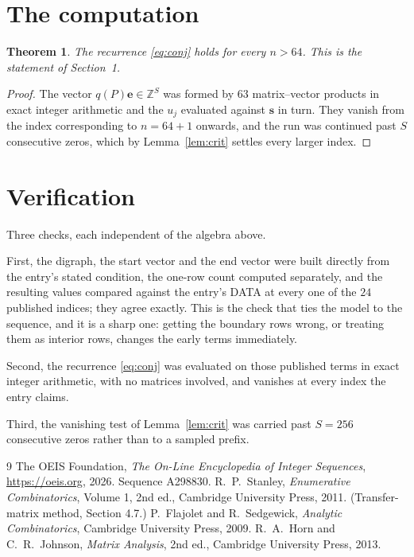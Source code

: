 \documentclass[11pt,a4paper]{article}
\theoremstyle{plain}
\newtheorem{theorem}{Theorem}
\theoremstyle{definition}
\begin{document}
\section{The computation}

\begin{theorem}
The recurrence \eqref{eq:conj} holds for every $n>64$. This is the statement of
Section~1.
\end{theorem}

\begin{proof}
The vector $q(P)\mathbf{e}\in\mathbb{Z}^{S}$ was formed by $63$ matrix--vector
products in exact integer arithmetic and the $u_j$ evaluated against $\mathbf{s}$ in turn.
They vanish from the index corresponding to $n=64+1$ onwards, and the run was continued
past $S$ consecutive zeros, which by Lemma~\ref{lem:crit} settles every larger index.
\end{proof}

\section{Verification}

Three checks, each independent of the algebra above.

First, the digraph, the start vector and the end vector were built directly from the
entry's stated condition, the one-row count computed separately, and the resulting values
compared against the entry's DATA at every one of the $24$ published indices; they
agree exactly. This is the check that ties the model to the sequence, and it is a sharp one:
getting the boundary rows wrong, or treating them as interior rows, changes the early terms
immediately.

Second, the recurrence \eqref{eq:conj} was evaluated on those published terms in exact
integer arithmetic, with no matrices involved, and vanishes at every index the entry claims.

Third, the vanishing test of Lemma~\ref{lem:crit} was carried past $S=256$ consecutive
zeros rather than to a sampled prefix.

\begin{thebibliography}{9}
 The OEIS Foundation, \emph{The On-Line Encyclopedia of Integer
Sequences}, \url{https://oeis.org}, 2026. Sequence A298830.
 R.~P.~Stanley, \emph{Enumerative Combinatorics}, Volume 1, 2nd ed.,
Cambridge University Press, 2011. (Transfer-matrix method, Section 4.7.)
 P.~Flajolet and R.~Sedgewick, \emph{Analytic Combinatorics}, Cambridge
University Press, 2009.
 R.~A.~Horn and C.~R.~Johnson, \emph{Matrix Analysis}, 2nd ed., Cambridge
University Press, 2013.
\end{thebibliography}
\end{document}
